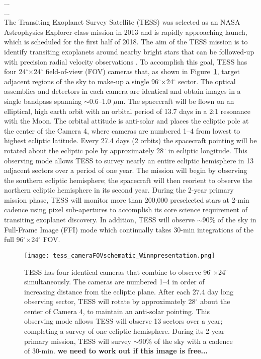 \documentclass[modern]{aastex61}
\begin{document}
...\\
...\\
The Transiting Exoplanet Survey Satellite (TESS) was selected as an NASA Astrophysics Explorer-class mission in 2013 and is rapidly approaching launch, which is scheduled for the first half of 2018. The aim of the TESS mission is to identify transiting exoplanets around nearby bright stars that can be followed-up with precision radial velocity observations \citep{Ricker2015}. To accomplish this goal, TESS has four 24$^{\circ}$$\times$24$^{\circ}$ field-of-view (FOV) cameras that, as shown in Figure~\ref{fig:cameras}, target adjacent regions of the sky to make-up a single 96$^{\circ}$$\times$24$^{\circ}$ sector. The optical assemblies and detectors in each camera are identical and obtain images in a single bandpass spanning $\sim$0.6--1.0 $\mu$m. The spacecraft will be flown on an elliptical, high earth orbit with an orbital period of 13.7 days in a 2:1 resonance with the Moon. The orbital attitude is anti-solar and places the ecliptic pole at the center of the Camera 4, where cameras are numbered 1--4 from lowest to highest ecliptic latitude. Every 27.4 days (2 orbits) the spacecraft pointing will be rotated about the ecliptic pole by approximately 28$^{\circ}$ in ecliptic longitude. This observing mode allows TESS to survey nearly an entire ecliptic hemisphere in 13 adjacent sectors over a period of one year. The mission will begin by observing the southern ecliptic hemisphere; the spacecraft will then reorient to observe the northern ecliptic hemisphere in its second year. During the 2-year primary mission phase, TESS will monitor more than 200,000 preselected stars at 2-min cadence using pixel sub-apertures to accomplish its core science requirement of transiting exoplanet discovery. In addition, TESS will observe $\sim$90\% of the sky in Full-Frame Image (FFI) mode which continually takes 30-min integrations of the full 96$^{\circ}$$\times$24$^{\circ}$ FOV. 

\begin{figure}
\centering
\texttt{[image: tess\_cameraFOVschematic\_Winnpresentation.png]}
\caption{TESS has four identical cameras that combine to observe 96$^{\circ}$$\times$24$^{\circ}$ simultaneously. The cameras are numbered 1--4 in order of increasing distance from the ecliptic plane. After each 27.4 day long observing sector, TESS will rotate by approximately 28$^{\circ}$ about the center of Camera 4, to maintain an anti-solar pointing. This observing mode allows TESS will observe 13 sectors over a year; completing a survey of one ecliptic hemisphere. During its 2-year primary mission, TESS will survey $\sim$90\% of the sky with a cadence of 30-min.
\textbf{we need to work out if this image is free...}}
\label{fig:cameras}
\end{figure}
\end{document}
